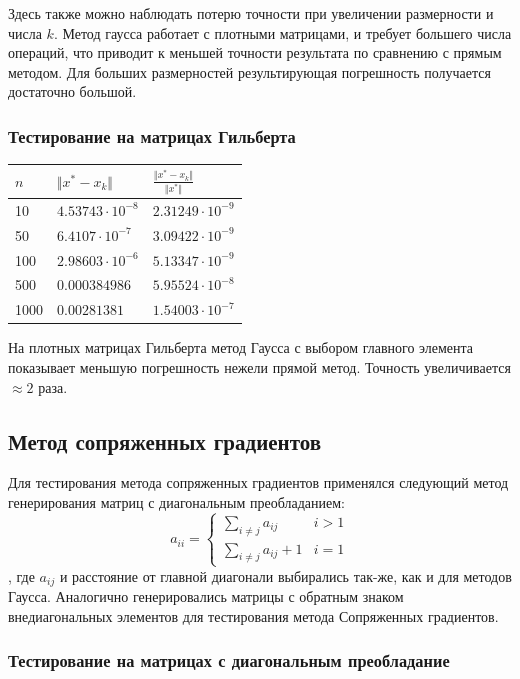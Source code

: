 \documentclass[english]{article}
\begin{document}
Здесь также можно наблюдать потерю точности при увеличении размерности
и числа \(k\). Метод гаусса работает с плотными матрицами, и требует
большего числа операций, что приводит к меньшей точности результата по
сравнению с прямым методом. Для больших размерностей результирующая
погрешность получается достаточно большой.

\subsubsection{Тестирование на матрицах Гильберта}
\begin{center}
  \begin{longtable}{l|l|l}
    \(n\) & \(\Vert x^* - x_k \Vert\) & \(\frac{\Vert x^* - x_k \Vert}{\Vert x^* \Vert}\) \\
    \hline
    10 & \(4.53743\cdot 10^{-8}\) & \(2.31249\cdot 10^{-9}\) \\
    50 & \(6.4107\cdot 10^{-7} \) & \(3.09422\cdot 10^{-9}\) \\
    100 & \(2.98603\cdot 10^{-6}\) & \(5.13347\cdot 10^{-9}\) \\
    500 & \(0.000384986\) & \(5.95524\cdot 10^{-8}\) \\
    1000 & \(0.00281381 \) & \(1.54003\cdot 10^{-7}\)
  \end{longtable}
\end{center}

На плотных матрицах Гильберта метод Гаусса с выбором главного элемента
показывает меньшую погрешность нежели прямой метод. Точность
увеличивается \(\approx 2\) раза.

\subsection{Метод сопряженных градиентов}
Для тестирования метода сопряженных градиентов применялся следующий
метод генерирования матриц с диагональным преобладанием:
\[ a_{ii} = \begin{cases}
  \sum\limits_{i \neq j} a_{ij} & i > 1 \\
  \sum\limits_{i \neq j} a_{ij} + 1 & i = 1
\end{cases} \]
, где \(a_{ij}\) и расстояние от главной диагонали выбирались так-же,
как и для методов Гаусса. Аналогично генерировались матрицы с
обратным знаком внедиагональных элементов для тестирования метода
Сопряженных градиентов.
\subsubsection{Тестирование на матрицах с диагональным преобладание}
\end{document}

